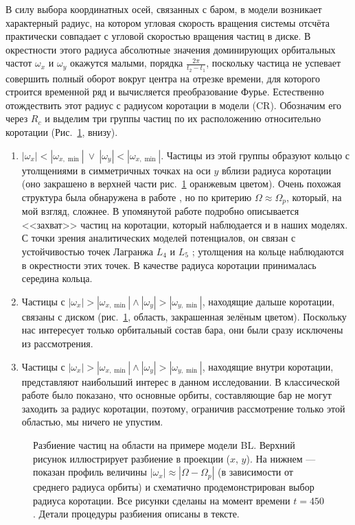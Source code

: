 \documentclass[tikz]{trlnotes}
\begin{document}
В силу выбора координатных осей, связанных с баром, в модели возникает характерный радиус, на котором угловая скорость вращения системы отсчёта практически совпадает с угловой скоростью вращения частиц в диске.
В окрестности этого радиуса абсолютные значения доминирующих
орбитальных частот $\omega_x$ и $\omega_y$ окажутся малыми, порядка $\frac{2\pi}{t_2 - t_1}$, поскольку частица не успевает совершить полный оборот вокруг центра на отрезке времени, для которого строится временной ряд и вычисляется преобразование Фурье. Естественно отождествить этот радиус с радиусом
коротации в модели (CR). Обозначим его через $R_c$ и выделим три группы частиц по их расположению относительно коротации
(Рис.~\ref{fig:disksplit}, внизу).
\begin{enumerate}
  \item $|ω_x| < |ω_{x, \min}| \:\lor\: |ω_y| < |ω_{x, \min}|$.
Частицы из этой группы образуют кольцо с утолщениями в
симметричных точках на оси $y$ вблизи радиуса коротации (оно закрашено в верхней части рис.~\ref{fig:disksplit} оранжевым цветом).
Очень похожая структура была обнаружена в работе \citet{ceverino2007}, но по критерию $Ω \approx Ω_p$, который, на мой взгляд, сложнее. В упомянутой работе подробно описывается <<захват>> частиц на коротации, который
наблюдается и в наших моделях. С точки зрения аналитических моделей потенциалов, он связан с устойчивостью
точек Лагранжа $L_4$ и $L_5$ \citep[Fig.~3.14]{2008gady.book.....B}; утолщения на кольце наблюдаются в окрестности этих точек.
В качестве радиуса коротации принималась середина кольца.  
\item Частицы с $|ω_x| > |ω_{x, \min}| \land |ω_y| > |ω_{y, \min}|$, находящие дальше коротации, связаны с диском
(рис.~\ref{fig:disksplit}, область, закрашенная зелёным цветом). Поскольку нас интересует только орбитальный состав бара, они были сразу исключены из рассмотрения. 
\item Частицы с $|ω_x| > |ω_{x, \min}| \land |ω_y| > |ω_{y, \min}|$,
  находящие внутри коротации, представляют наибольший интерес в данном
  исследовании. В классической работе \citet{contopoulos1980} было
  показано, что основные орбиты, составляющие
бар не могут заходить за радиус коротации, поэтому, ограничив рассмотрение только этой областью, мы ничего не
упустим.
\end{enumerate}

\begin{figure}[htpb]
  \centering
  \par
  \caption{Разбиение частиц на области на примере модели BL.
    Верхний рисунок иллюстрирует разбиение в проекции ($x$, $y$).
    На нижнем --- показан профиль величины $|ω_x| \approx |Ω - Ω_p|$ (в зависимости от среднего радиуса орбиты) и схематично продемонстрирован выбор радиуса коротации. Все рисунки сделаны на момент времени $t=450$.
Детали процедуры разбиения описаны в тексте.}%
  \label{fig:disksplit}
\end{figure}
\end{document}
